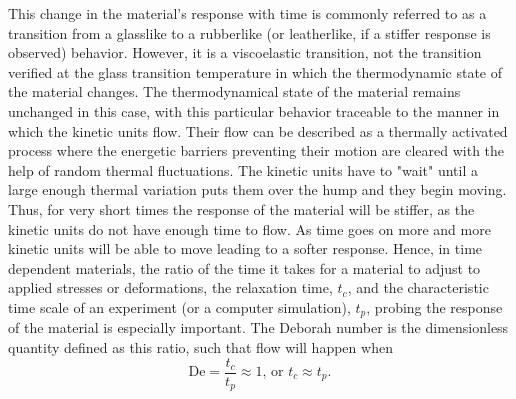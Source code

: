 This change in the material's response with time is commonly referred to as a transition from a glasslike to a rubberlike (or leatherlike, if a stiffer response is observed) behavior.
However, it is a viscoelastic transition, not the transition verified at the glass transition temperature in which the thermodynamic state of the material changes.
The thermodynamical state of the material remains unchanged in this case, with this particular behavior traceable to the manner in which the kinetic units flow.
Their flow can be described as a thermally activated process where the energetic barriers preventing their motion are cleared with the help of random thermal fluctuations.
The kinetic units have to "wait" until a large enough thermal variation puts them over the hump and they begin moving.
Thus, for very short times the response of the material will be stiffer, as the kinetic units do not have enough time to flow.
As time goes on more and more kinetic units will be able to move leading to a softer response.
Hence, in time dependent materials, the ratio of the time it takes for a material to adjust to applied stresses or deformations, the relaxation time, $t_c$, and the characteristic time scale of an experiment (or a computer simulation), $t_p$, probing the response of the material is especially important.
The Deborah number is the dimensionless quantity defined as this ratio, such that flow will happen when \citep{wardIntroductionMechanicalProperties2004, arzhakovRelaxationPhysicalMechanical2019}
\begin{equation}
	\mathrm{De}=\frac{t_c}{t_p}\approx 1\text{, or  }t_c\approx t_p.
\end{equation}

